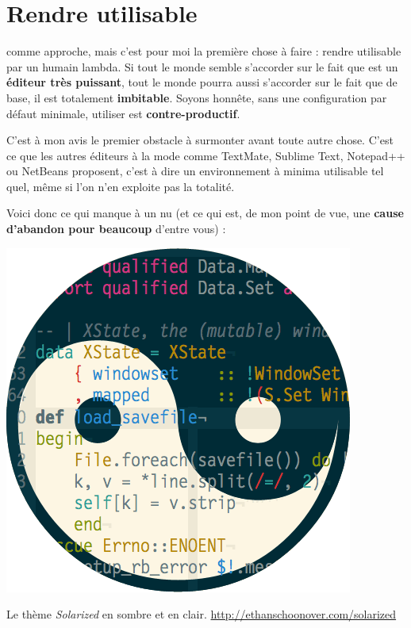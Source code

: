\chapter{Rendre \vim utilisable}

 comme approche, mais c'est pour moi la première chose à faire : rendre \vim utilisable par un humain lambda. Si tout le monde semble s'accorder sur le fait que \vim est un \textbf{éditeur très puissant}, tout le monde pourra aussi s'accorder sur le fait que de base, il est totalement \textbf{imbitable}. Soyons honnête, sans une configuration par défaut minimale, utiliser \vim est \textbf{contre-productif}. 

C'est à mon avis le premier obstacle à surmonter avant toute autre chose. C'est ce que les autres éditeurs \og à la mode \fg{} comme TextMate, Sublime Text, Notepad++ ou NetBeans proposent, c'est à dire un environnement à minima utilisable tel quel, même si l'on n'en exploite pas la totalité.

Voici donc ce qui manque à un \vim nu (et ce qui est, de mon point de vue, une \textbf{cause d'abandon pour beaucoup} d'entre vous) :

\begin{marginfigure}%
  \includegraphics[width=\linewidth]{graphics/solarized-yinyang.png}
  \caption{Le thème \emph{Solarized} en sombre et en clair. \url{http://ethanschoonover.com/solarized}}
  \label{fig:solarized}
\end{marginfigure}

